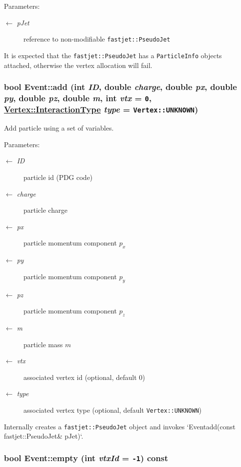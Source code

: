 \begin{Desc}
\item[Parameters:]
\begin{description}
\item[\mbox{$\leftarrow$} {\em p\-Jet}]reference to non-modifiable {\tt fastjet::Pseudo\-Jet} \end{description}
\end{Desc}
It is expected that the {\tt fastjet::Pseudo\-Jet} has a {\tt Particle\-Info} objects attached, otherwise the vertex allocation will fail. \hypertarget{classEvent_bed4fa66809b95131871c0e8040d6b2c}{
\subsubsection[add]{\setlength{\rightskip}{0pt plus 5cm}bool Event::add (int {\em ID}, double {\em charge}, double {\em px}, double {\em py}, double {\em pz}, double {\em m}, int {\em vtx} = {\tt 0}, \hyperlink{classVertex_0d80a5c5ed3bd9be72a325aa448eca25}{Vertex::Interaction\-Type} {\em type} = {\tt Vertex::UNKNOWN})}}
\label{classEvent_bed4fa66809b95131871c0e8040d6b2c}


Add particle using a set of variables. 

\begin{Desc}
\item[Parameters:]
\begin{description}
\item[\mbox{$\leftarrow$} {\em ID}]particle id (PDG code) \item[\mbox{$\leftarrow$} {\em charge}]particle charge \item[\mbox{$\leftarrow$} {\em px}]particle momentum component $p_{x}$ \item[\mbox{$\leftarrow$} {\em py}]particle momentum component $p_{y}$ \item[\mbox{$\leftarrow$} {\em pz}]particle momentum component $p_{z}$ \item[\mbox{$\leftarrow$} {\em m}]particle mass $m$ \item[\mbox{$\leftarrow$} {\em vtx}]associated vertex id (optional, default 0) \item[\mbox{$\leftarrow$} {\em type}]associated vertex type (optional, default {\tt Vertex::UNKNOWN})\end{description}
\end{Desc}
Internally creates a {\tt fastjet::Pseudo\-Jet} object and invokes `Eventadd(const fastjet::Pseudo\-Jet\& p\-Jet)`. \hypertarget{classEvent_91389b1bfa6a0d3647dd0e012be486a4}{
\subsubsection[empty]{\setlength{\rightskip}{0pt plus 5cm}bool Event::empty (int {\em vtx\-Id} = {\tt -1}) const}}
\label{classEvent_91389b1bfa6a0d3647dd0e012be486a4}


